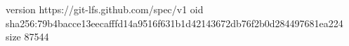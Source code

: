 version https://git-lfs.github.com/spec/v1
oid sha256:79b4bacce13eecafffd14a9516f631b1d42143672db76f2b0d284497681ea224
size 87544
